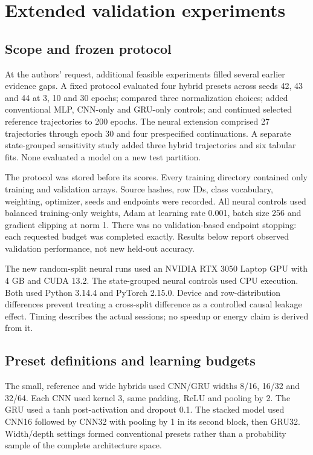 \chapter{Extended validation experiments}
\section{Scope and frozen protocol}
At the authors' request, additional feasible experiments filled several earlier evidence gaps. A fixed protocol evaluated four hybrid presets across seeds 42, 43 and 44 at 3, 10 and 30 epochs; compared three normalization choices; added conventional MLP, CNN-only and GRU-only controls; and continued selected reference trajectories to 200 epochs. The neural extension comprised 27 trajectories through epoch 30 and four prespecified continuations. A separate state-grouped sensitivity study added three hybrid trajectories and six tabular fits. None evaluated a model on a new test partition.

The protocol was stored before its scores. Every training directory contained only training and validation arrays. Source hashes, row IDs, class vocabulary, weighting, optimizer, seeds and endpoints were recorded. All neural controls used balanced training-only weights, Adam at learning rate 0.001, batch size 256 and gradient clipping at norm 1. There was no validation-based endpoint stopping: each requested budget was completed exactly. Results below report observed validation performance, not new held-out accuracy.

The new random-split neural runs used an NVIDIA RTX 3050 Laptop GPU with 4 GB and CUDA 13.2. The state-grouped neural controls used CPU execution. Both used Python 3.14.4 and PyTorch 2.15.0. Device and row-distribution differences prevent treating a cross-split difference as a controlled causal leakage effect. Timing describes the actual sessions; no speedup or energy claim is derived from it.

\section{Preset definitions and learning budgets}
The small, reference and wide hybrids used CNN/GRU widths 8/16, 16/32 and 32/64. Each CNN used kernel 3, same padding, ReLU and pooling by 2. The GRU used a tanh post-activation and dropout 0.1. The stacked model used CNN16 followed by CNN32 with pooling by 1 in its second block, then GRU32. Width/depth settings formed conventional presets rather than a probability sample of the complete architecture space.

